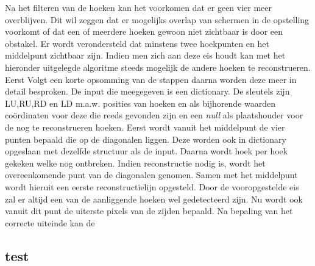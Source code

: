 
	Na het filteren van de hoeken kan het voorkomen dat er geen vier meer overblijven. Dit wil zeggen dat er mogelijks overlap van schermen in de opstelling voorkomt of dat een of meerdere hoeken gewoon niet zichtbaar is door een obstakel. Er wordt verondersteld dat minstens twee hoekpunten en het middelpunt zichtbaar zijn. Indien men zich aan deze eis houdt kan met het hieronder uitgelegde algoritme steeds mogelijk de andere hoeken te reconstrueren. Eerst Volgt een korte opsomming van de stappen daarna worden deze meer in detail besproken. De input die meegegeven is een dictionary. De sleutels zijn LU,RU,RD en LD m.a.w. posities van hoeken en als bijhorende waarden coördinaten voor deze die reeds gevonden zijn en een \textit{null} als plaatshouder voor de nog te reconstrueren hoeken. Eerst wordt vanuit het middelpunt de vier punten bepaald die op de diagonalen liggen. Deze worden ook in dictionary opgeslaan met dezelfde structuur als de input. Daarna wordt hoek per hoek gekeken welke nog ontbreken. Indien reconstructie nodig is, wordt het overeenkomende punt van de diagonalen genomen. Samen met het middelpunt wordt hieruit een eerste reconstructielijn opgesteld. Door de vooropgestelde eis zal er altijd een van de aanliggende hoeken wel gedetecteerd zijn. Nu wordt ook vanuit dit punt de uiterste pixels van de zijden bepaald. Na bepaling van het correcte uiteinde kan de 
	
	\subsection{test}
